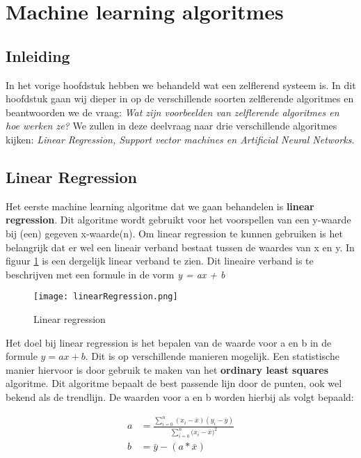 \section{Machine learning algoritmes}
\label{chapter:MLA}

\subsection{Inleiding}
In het vorige hoofdstuk hebben we behandeld wat een zelflerend systeem is. In dit hoofdstuk gaan wij dieper in op de verschillende soorten zelflerende algoritmes en beantwoorden we de vraag: \textit{Wat zijn voorbeelden van zelflerende algoritmes en hoe werken ze?} We zullen in deze deelvraag naar drie verschillende algoritmes kijken: \textit{Linear Regression, Support vector machines en Artificial Neural Networks.} \cite{SunilRay} 

\subsection{Linear Regression}
Het eerste machine learning algoritme dat we gaan behandelen is \textbf{linear regression}. Dit algoritme wordt gebruikt voor het voorspellen van een y-waarde bij (een) gegeven x-waarde(n). Om linear regression te kunnen gebruiken is het belangrijk dat er wel een lineair verband bestaat tussen de waardes van x en y. In figuur \ref{fig:LinearRegression1} is een dergelijk linear verband te zien. 
Dit lineaire verband is te beschrijven met een formule in de vorm \textit{y = ax + b}

\begin{figure}[h]
  \centering
    \texttt{[image: linearRegression.png]}
  \caption{Linear regression}
  \label{fig:LinearRegression1}
\end{figure}

Het doel bij linear regression is het bepalen van de waarde voor a en b in de formule $ y = ax + b $. Dit is op verschillende manieren mogelijk. Een statistische manier hiervoor is door gebruik te maken van het \textbf{ordinary least squares} algoritme. Dit algoritme bepaalt de best passende lijn door de punten, ook wel bekend als de trendlijn. De waarden voor a en b worden hierbij als volgt bepaald:

\begin{align*}
	a&=\frac{\sum_{i=0}^{n}(x_{i}-\bar{x})(y_{i}-\bar{y})}{\sum_{i=0}^{n}{(x_{i}-\bar{x}})^{2}}\\
	b&=\bar{y}-(a * \bar{x})
\end{align*}

